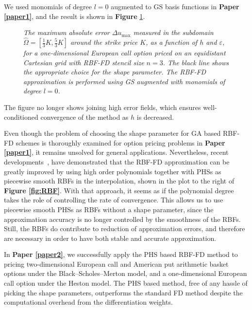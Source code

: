 \documentclass{UUThesisTemplate}
\begin{document}
\par
We used monomials of degree $l=0$ augmented to GS basis functions in \textbf{Paper \ref{paper1}}, and the result is shown in \textbf{Figure} \ref{fig:contour2}. 
\begin{figure}[H]
\centering
%

\caption{\emph{The maximum absolute error $\Delta u_{\max}$ measured in the subdomain $\hat\Omega=[\frac{1}{3}K,\frac{5}{3}K]$ around the strike price $K$, as a function of $h$ and $\varepsilon$, for a one-dimensional European call option priced on an equidistant Cartesian grid with RBF-FD stencil size $n=3$. The black line shows the appropriate choice for the shape parameter. The RBF-FD approximation is performed using GS augmented with monomials of degree $l=0$.}}
\label{fig:contour2}
\end{figure}
\noindent The figure no longer shows joining high error fields, which ensures well-conditioned convergence of the method as $h$ is decreased.

\par
Even though the problem of choosing the shape parameter for GA based RBF-FD schemes is thoroughly examined for option pricing problems in \textbf{Paper \ref{paper1}}, it remains unsolved for general applications. Nevertheless, recent developments~\cite{flyer2016on, bayona2017role}, have demonstrated that the RBF-FD approximation can be greatly improved by using high order polynomials together with PHSs as piecewise smooth RBFs in the interpolation, shown in the plot to the right of \textbf{Figure \ref{fig:RBF}}. With that approach, it seems as if the polynomial degree takes the role of controlling the rate of convergence. This allows us to use piecewise smooth PHSs as RBFs without a shape parameter, since the approximation accuracy is no longer controlled by the smoothness of the RBFs. Still, the RBFs do contribute to reduction of approximation errors, and therefore are necessary in order to have both stable and accurate approximation.

\par
In \textbf{Paper \ref{paper2}}, we successfully apply the PHS based RBF-FD method to pricing two-dimensional European call and American put arithmetic basket options under the Black--Scholes--Merton model, and a one-dimensional European call option under the Heston model. The PHS based method, free of any hassle of picking the shape parameters, outperforms the standard FD method despite the computational overhead from the differentiation weights.
%
\end{document}
